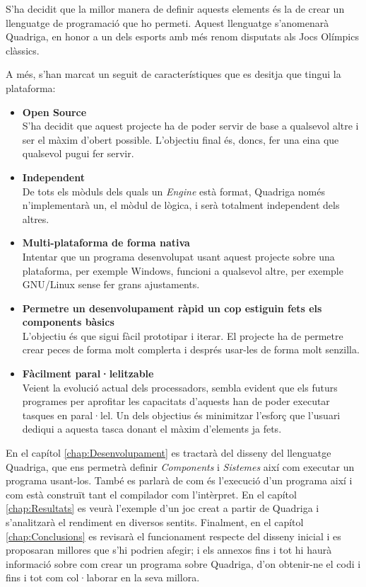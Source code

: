 S'ha decidit que la millor manera de definir aquests elements és la de crear un llenguatge de programació que ho permeti. Aquest llenguatge s'anomenarà Quadriga, en honor a un dels esports amb més renom disputats als Jocs Olímpics clàssics.

A més, s'han marcat un seguit de característiques que es desitja que tingui la plataforma:

\begin{itemize}
  \item {\bf Open Source} \hfill \\
    S'ha decidit que aquest projecte ha de poder servir de base a qualsevol altre i ser el màxim d'obert possible. L'objectiu final és, doncs, fer una eina que qualsevol pugui fer servir.
    
  \item {\bf Independent} \hfill \\
    De tots els mòduls dels quals un {\em Engine} està format, Quadriga només n'implementarà un, el mòdul de lògica, i serà totalment independent dels altres.
    
  \item {\bf Multi-plataforma de forma nativa} \hfill \\
    Intentar que un programa desenvolupat usant aquest projecte sobre una plataforma, per exemple Windows, funcioni a qualsevol altre, per exemple GNU/Linux sense fer grans ajustaments.
    
  \item {\bf Permetre un desenvolupament ràpid un cop estiguin fets els components bàsics} \hfill \\
    L'objectiu és que sigui fàcil prototipar i iterar. El projecte ha de permetre crear peces de forma molt complerta i després usar-les de forma molt senzilla.
    
  \item {\bf Fàcilment paral·lelitzable} \hfill \\
    Veient la evolució actual dels processadors, sembla evident que els futurs programes per aprofitar les capacitats d'aquests han de poder executar tasques en paral·lel. Un dels objectius és minimitzar l'esforç que l'usuari dediqui a aquesta tasca donant el màxim d'elements ja fets.
\end{itemize}


En el capítol \ref{chap:Desenvolupament} es tractarà del disseny del llenguatge Quadriga, que ens permetrà definir {\em Components} i {\em Sistemes} així com executar un programa usant-los. També es parlarà de com és l'execució d'un programa així i com està construït tant el compilador com l'intèrpret. En el capítol \ref{chap:Resultats} es veurà l'exemple d'un joc creat a partir de Quadriga i s'analitzarà el rendiment en diversos sentits. Finalment, en el capítol \ref{chap:Conclusions} es revisarà el funcionament respecte del disseny inicial i es proposaran millores que s'hi podrien afegir; i els annexos fins i tot hi haurà informació sobre com crear un programa sobre Quadriga, d'on obtenir-ne el codi i fins i tot com col·laborar en la seva millora.